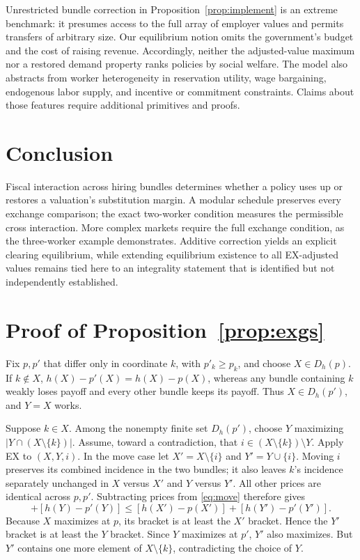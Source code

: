 \documentclass[11pt]{article}
\theoremstyle{definition}
\theoremstyle{remark}
\numberwithin{equation}{section}
\begin{document}
Unrestricted bundle correction in Proposition~\ref{prop:implement} is an extreme benchmark: it presumes access to the full array of employer values and permits transfers of arbitrary size. Our equilibrium notion omits the government's budget and the cost of raising revenue. Accordingly, neither the adjusted-value maximum nor a restored demand property ranks policies by social welfare. The model also abstracts from worker heterogeneity in reservation utility, wage bargaining, endogenous labor supply, and incentive or commitment constraints. Claims about those features require additional primitives and proofs.

\section{Conclusion}
Fiscal interaction across hiring bundles determines whether a policy uses up or restores a valuation's substitution margin. A modular schedule preserves every exchange comparison; the exact two-worker condition measures the permissible cross interaction. More complex markets require the full exchange condition, as the three-worker example demonstrates. Additive correction yields an explicit clearing equilibrium, while extending equilibrium existence to all EX-adjusted values remains tied here to an integrality statement that is identified but not independently established.

\appendix
\section{Proof of Proposition~\ref{prop:exgs}}\label{app:exgs}

Fix $p,p'$ that differ only in coordinate $k$, with $p'_k\ge p_k$, and choose $X\in D_h(p)$. If $k\notin X$, $h(X)-p'(X)=h(X)-p(X)$, whereas any bundle containing $k$ weakly loses payoff and every other bundle keeps its payoff. Thus $X\in D_h(p')$, and $Y=X$ works.

Suppose $k\in X$. Among the nonempty finite set $D_h(p')$, choose $Y$ maximizing $|Y\cap(X\setminus\{k\})|$. Assume, toward a contradiction, that $i\in(X\setminus\{k\})\setminus Y$. Apply EX to $(X,Y,i)$. In the move case let $X'=X\setminus\{i\}$ and $Y'=Y\cup\{i\}$. Moving $i$ preserves its combined incidence in the two bundles; it also leaves $k$'s incidence separately unchanged in $X$ versus $X'$ and $Y$ versus $Y'$. All other prices are identical across $p,p'$. Subtracting prices from \eqref{eq:move} therefore gives
\begin{equation}
[h(X)-p(X)]+[h(Y)-p'(Y)]
\le [h(X')-p(X')]+[h(Y')-p'(Y')].             \label{eq:gsproof}
\end{equation}
Because $X$ maximizes at $p$, its bracket is at least the $X'$ bracket. Hence the $Y'$ bracket is at least the $Y$ bracket. Since $Y$ maximizes at $p'$, $Y'$ also maximizes. But $Y'$ contains one more element of $X\setminus\{k\}$, contradicting the choice of $Y$.
\end{document}
